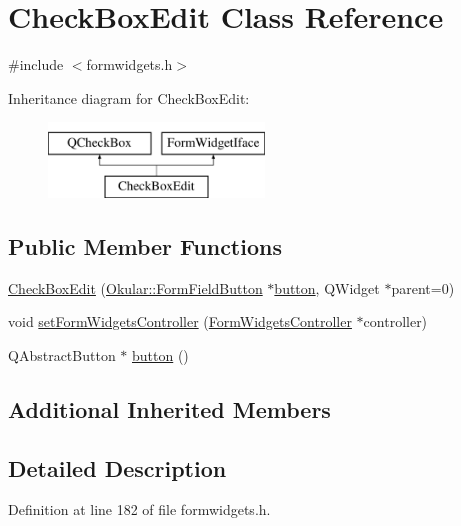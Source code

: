 \hypertarget{classCheckBoxEdit}{\section{Check\+Box\+Edit Class Reference}
\label{classCheckBoxEdit}
}


{\ttfamily \#include $<$formwidgets.\+h$>$}

Inheritance diagram for Check\+Box\+Edit\+:\begin{figure}[H]
\begin{center}
\leavevmode
\includegraphics[height=2.000000cm]{classCheckBoxEdit}
\end{center}
\end{figure}
\subsection*{Public Member Functions}
\begin{DoxyCompactItemize}
\item 
\hyperlink{classCheckBoxEdit_a0b3c2bc4389a32a8a41b61b7e0698e6c}{Check\+Box\+Edit} (\hyperlink{classOkular_1_1FormFieldButton}{Okular\+::\+Form\+Field\+Button} $\ast$\hyperlink{classCheckBoxEdit_acec5a34a30f87ab0d146ae0532adf288}{button}, Q\+Widget $\ast$parent=0)
\item 
void \hyperlink{classCheckBoxEdit_aa529e8646ebcb3d1f675f6ce54b48ada}{set\+Form\+Widgets\+Controller} (\hyperlink{classFormWidgetsController}{Form\+Widgets\+Controller} $\ast$controller)
\item 
Q\+Abstract\+Button $\ast$ \hyperlink{classCheckBoxEdit_acec5a34a30f87ab0d146ae0532adf288}{button} ()
\end{DoxyCompactItemize}
\subsection*{Additional Inherited Members}


\subsection{Detailed Description}


Definition at line 182 of file formwidgets.\+h.



